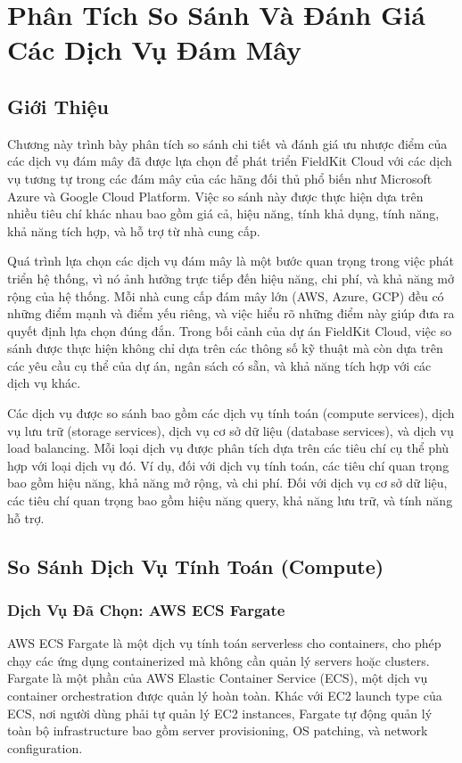 \section{Phân Tích So Sánh Và Đánh Giá Các Dịch Vụ Đám Mây}

\subsection{Giới Thiệu}

Chương này trình bày phân tích so sánh chi tiết và đánh giá ưu nhược điểm của các dịch vụ đám mây đã được lựa chọn để phát triển FieldKit Cloud với các dịch vụ tương tự trong các đám mây của các hãng đối thủ phổ biến như Microsoft Azure và Google Cloud Platform. Việc so sánh này được thực hiện dựa trên nhiều tiêu chí khác nhau bao gồm giá cả, hiệu năng, tính khả dụng, tính năng, khả năng tích hợp, và hỗ trợ từ nhà cung cấp.

Quá trình lựa chọn các dịch vụ đám mây là một bước quan trọng trong việc phát triển hệ thống, vì nó ảnh hưởng trực tiếp đến hiệu năng, chi phí, và khả năng mở rộng của hệ thống. Mỗi nhà cung cấp đám mây lớn (AWS, Azure, GCP) đều có những điểm mạnh và điểm yếu riêng, và việc hiểu rõ những điểm này giúp đưa ra quyết định lựa chọn đúng đắn. Trong bối cảnh của dự án FieldKit Cloud, việc so sánh được thực hiện không chỉ dựa trên các thông số kỹ thuật mà còn dựa trên các yêu cầu cụ thể của dự án, ngân sách có sẵn, và khả năng tích hợp với các dịch vụ khác.

Các dịch vụ được so sánh bao gồm các dịch vụ tính toán (compute services), dịch vụ lưu trữ (storage services), dịch vụ cơ sở dữ liệu (database services), và dịch vụ load balancing. Mỗi loại dịch vụ được phân tích dựa trên các tiêu chí cụ thể phù hợp với loại dịch vụ đó. Ví dụ, đối với dịch vụ tính toán, các tiêu chí quan trọng bao gồm hiệu năng, khả năng mở rộng, và chi phí. Đối với dịch vụ cơ sở dữ liệu, các tiêu chí quan trọng bao gồm hiệu năng query, khả năng lưu trữ, và tính năng hỗ trợ.

\subsection{So Sánh Dịch Vụ Tính Toán (Compute)}

\subsubsection{Dịch Vụ Đã Chọn: AWS ECS Fargate}

AWS ECS Fargate là một dịch vụ tính toán serverless cho containers, cho phép chạy các ứng dụng containerized mà không cần quản lý servers hoặc clusters. Fargate là một phần của AWS Elastic Container Service (ECS), một dịch vụ container orchestration được quản lý hoàn toàn. Khác với EC2 launch type của ECS, nơi người dùng phải tự quản lý EC2 instances, Fargate tự động quản lý toàn bộ infrastructure bao gồm server provisioning, OS patching, và network configuration.

